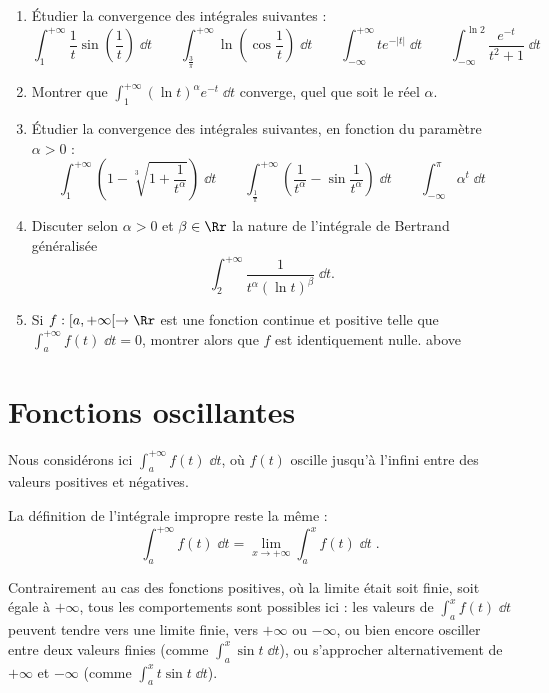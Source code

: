 \documentclass[class=report,crop=false]{standalone}
\begin{document}
\begin{miniexercices}
\begin{enumerate}
  \item \'Etudier la convergence des intégrales suivantes :  
  $$\int_{1}^{+\infty} \frac{1}{t}\sin\left(\frac{1}{t}\right) \;\dd t \qquad
  \int_{\frac{3}{\pi}}^{+\infty}\ln\left(\cos\frac{1}{t}\right) \;\dd t \qquad
  \int_{-\infty}^{+\infty} te^{-|t|}\;\dd t \qquad
  \int_{-\infty}^{\ln 2} \frac{e^{-t}}{t^2+1}\;\dd t$$
  
  \item Montrer que $\int_1^{+\infty} (\ln t)^\alpha e^{-t}\;\dd t$ converge,
quel que soit le réel $\alpha$. 

  \item \'Etudier la convergence des intégrales suivantes, en fonction du paramètre $\alpha>0$ :
  $$\int_{1}^{+\infty} \left(1-\sqrt[3]{1+\frac{1}{t^\alpha}}\right) \;\dd t \qquad
  \int_{\frac{1}{\pi}}^{+\infty} \left(\frac{1}{t^\alpha}-\sin\frac{1}{t^\alpha}\right)  \;\dd t \qquad
  \int_{-\infty}^{\pi} \alpha^t \;\dd t$$
  
  \item Discuter selon $\alpha>0$ et $\beta \in \Rr$ la nature de l'intégrale 
  de Bertrand généralisée
  $$\int_2^{+\infty} \frac{1}{t^\alpha(\ln t)^{\beta}}\;\dd t.$$
  
  \item Si $f : [a,+\infty[ \to \Rr$ est une fonction continue et positive telle que
  $\int_a^{+\infty} f(t)\;\dd t = 0$, montrer alors que $f$ est identiquement nulle.
  above
\end{enumerate}
\end{miniexercices}




\section{Fonctions oscillantes}

Nous considérons ici $\int_a^{+\infty} f(t)\;\dd t$, où $f(t)$
oscille jusqu'à l'infini entre des valeurs positives et négatives.



La définition de l'intégrale impropre reste la même :
$$\int_a^{+\infty} f(t)\;\dd t = \lim_{x\rightarrow +\infty} \int_a^x f(t)\;\dd t\;.$$

Contrairement au cas des fonctions positives, où la limite était
soit finie, soit égale à $+\infty$, tous les comportements sont
possibles ici : les valeurs de $\int_a^x f(t)\;\dd t$ peuvent tendre vers
une limite finie, vers $+\infty$ ou $-\infty$, ou bien encore osciller
entre deux valeurs finies (comme $\int_a^x \sin t \;\dd t$), ou
s'approcher alternativement de $+\infty$ et $-\infty$ (comme $\int_a^x
t\sin t \;\dd t$). 
\end{document}
